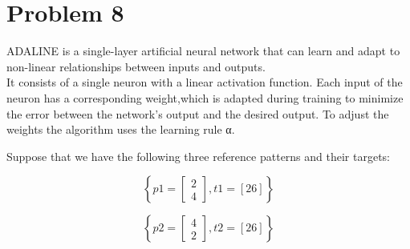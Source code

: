 
\section{Problem 8}
ADALINE is a single-layer artificial neural network that can learn and adapt to non-linear relationships between inputs and outputs. \\
It consists of a single neuron with a linear activation function. Each input of the neuron has a corresponding weight,which is adapted during training to minimize the error between the network's output and the desired output. To adjust the weights the algorithm uses the learning rule α.
\vspace{0.3cm}

Suppose that we have the following three reference patterns and their targets:

\[
\left\{ 
p1 = \left[
\begin{array}{c}
	2 \\
	4
\end{array}
\right], t1 = \left[26\right]
\right\}
\]

\[
\left\{ 
p2 = \left[
\begin{array}{c}
	4 \\
	2
\end{array}
\right], t2 = \left[26\right]
\right\}
\]